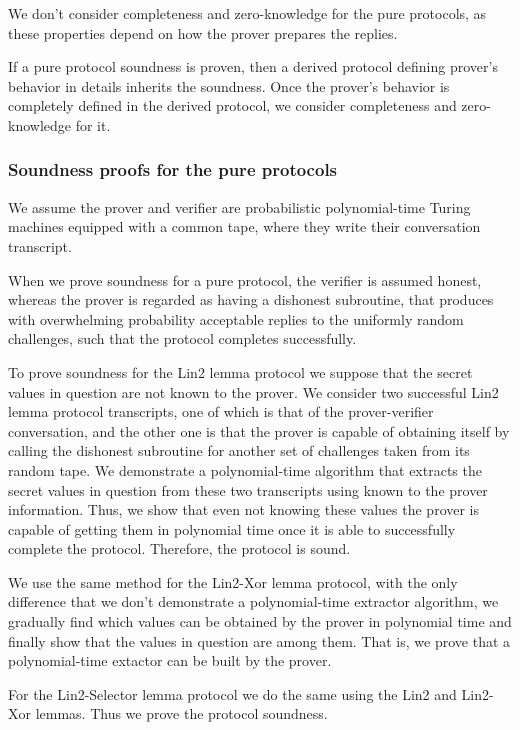 \documentclass{mathcryptology} %
\theoremstyle{title}
\theoremstyle{titleof}
\begin{document}
    We don't consider completeness and zero-knowledge for the pure protocols, as these properties depend on how the prover prepares the replies.

    If a pure protocol soundness is proven, then a derived protocol defining prover's behavior in details inherits the soundness. Once the prover's behavior is completely defined in the derived protocol, we consider completeness and zero-knowledge for it.
    

\subsubsection{Soundness proofs for the pure protocols}
    We assume the prover and verifier are probabilistic polynomial-time Turing machines equipped with a common tape, where they write their conversation transcript. 
    
    When we prove soundness for a pure protocol, the verifier is assumed honest, whereas the prover is regarded as having a dishonest subroutine, that produces with overwhelming probability acceptable replies to the uniformly random challenges, such that the protocol completes successfully.

    To prove soundness for the Lin2 lemma protocol we suppose that the secret values in question are not known to the prover. We consider two successful Lin2 lemma protocol transcripts, one of which is that of the prover-verifier conversation, and the other one is that the prover is capable of obtaining itself by calling the dishonest subroutine for another set of challenges taken from its random tape. We demonstrate a polynomial-time algorithm that extracts the secret values in question from these two transcripts using known to the prover information. Thus, we show that even not knowing these values the prover is capable of getting them in polynomial time once it is able to successfully complete the protocol. Therefore, the protocol is sound.
    
    We use the same method for the Lin2-Xor lemma protocol, with the only difference that we don't demonstrate a polynomial-time extractor algorithm, we gradually find which values can be obtained by the prover in polynomial time and finally show that the values in question are among them. That is, we prove that a polynomial-time extactor can be built by the prover.
    
    For the Lin2-Selector lemma protocol we do the same using the Lin2 and Lin2-Xor lemmas. Thus we prove the protocol soundness.
\end{document}
